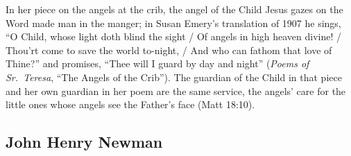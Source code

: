 In her piece on the angels at the crib, the angel of the Child
Jesus gazes on the Word made man in the manger; in Susan Emery's translation
of 1907 he sings, ``O Child, whose light doth blind the sight / Of angels in
high heaven divine! / Thou'rt come to save the world to-night, / And who can
fathom that love of Thine?'' and promises, ``Thee will I guard by day and
night'' (\emph{Poems of Sr.\ Teresa}, ``The Angels of the Crib''). The
guardian of the Child in that piece and her own guardian in her poem are the
same service, the angels' care for the little ones whose angels see the
Father's face (Matt 18:10).

\sectionguard\subsection{John Henry Newman}\label{sec:sa-newman}

